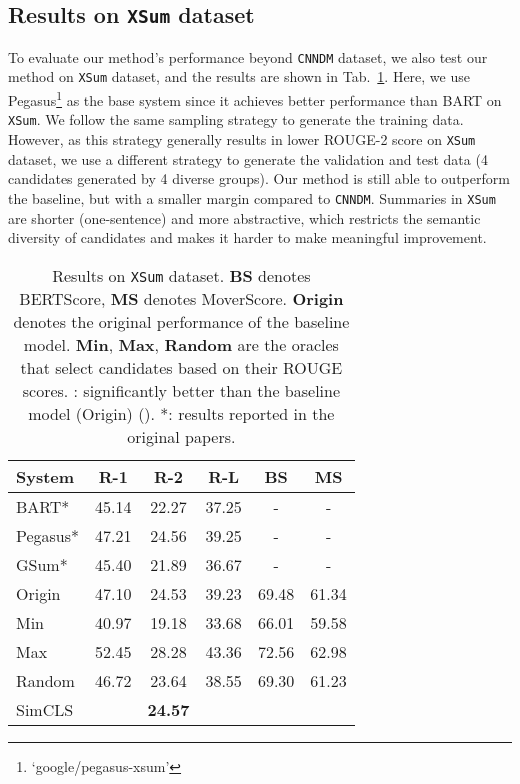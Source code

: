 \documentclass[11pt,a4paper]{article}
\begin{document}
\subsection{Results on \texttt{XSum} dataset}

To evaluate our method's performance beyond \texttt{CNNDM} dataset, we also test our method on \texttt{XSum} dataset, and the results are shown in Tab.~\ref{tab:other}.
Here, we use Pegasus\footnote{`google/pegasus-xsum'} as the base system since it achieves better performance than BART on \texttt{XSum}.
We follow the same sampling strategy to generate the training data.
However, as this strategy generally results in lower ROUGE-2 score on \texttt{XSum} dataset, we use a different strategy to generate the validation and test data (4 candidates generated by 4 diverse groups).
Our method is still able to outperform the baseline, but with a smaller margin compared to \texttt{CNNDM}.
Summaries in \texttt{XSum} are shorter (one-sentence) and more abstractive, which restricts the semantic diversity of candidates and makes it harder to make meaningful improvement.
\begin{table}[t!]
\small
\centering
\addtolength{\tabcolsep}{-1pt} 
\begin{tabular}{lccccc}
\toprule
\textbf{System} & \textbf{R-1} & \textbf{R-2} & \textbf{R-L}  & \textbf{BS} & \textbf{MS}\\
 \midrule
 BART* & 45.14 & 22.27 & 37.25 & - & -\\
 Pegasus* & 47.21 & 24.56 & 39.25 & - & - \\
 GSum* & 45.40 & 21.89 & 36.67 & - & -\\
\midrule
 Origin & 47.10 & 24.53 & 39.23 & 69.48 & 61.34\\
 Min & 40.97 & 19.18 & 33.68 & 66.01 & 59.58 \\
 Max & 52.45 & 28.28 & 43.36 & 72.56 & 62.98\\
 Random & 46.72 & 23.64 & 38.55 & 69.30 & 61.23\\
\midrule
 SimCLS &  & \textbf{24.57} &  &  & \\
\bottomrule
\end{tabular}
\addtolength{\tabcolsep}{+1pt} 
\vspace{-2mm}
\caption{\label{tab:other} Results on \texttt{XSum} dataset. 
\textbf{BS} denotes BERTScore, \textbf{MS} denotes MoverScore. 
\textbf{Origin} denotes the original performance of the baseline model.
\textbf{Min}, \textbf{Max}, \textbf{Random} are the oracles that select candidates based on their ROUGE scores.
\dag: significantly better than the baseline model (Origin) (). 
*: results reported in the original papers.}
\end{table}
\end{document}
